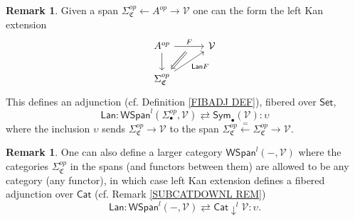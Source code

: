 \documentclass[a4paper,10pt
]{article}%
\numberwithin{equation}{section}
\numberwithin{figure}{section}
\theoremstyle{definition} %
\newtheorem{remark}[equation]{Remark}%
\newcommand{\1}{\ensuremath{\mathbbm 1}}%
\begin{document}
\begin{remark}\label{LANADJ REM}
	Given a span $\Sigma^{op}_{\mathfrak{C}} \leftarrow A^{op} \rightarrow \mathcal{V}$
	one can the form the left Kan extension
	\[
	\begin{tikzcd}[column sep = 30pt]
	A^{op}
	\ar{r}[name=U,swap]{}{F} \ar{d} 
	&
	\mathcal{V}	
	\\
	|[alias=V]|
	\Sigma_{\mathfrak{C}}^{op} 
	\ar{ru}[swap]{\mathsf{Lan} F}
	\arrow[Leftarrow, from=V, to=U,shorten >=0.05cm,shorten <=0.05cm]
	\end{tikzcd}
	\]
	This defines an adjunction (cf. Definition \ref{FIBADJ DEF}),
	fibered over $\mathsf{Set}$,
	\[
	\mathsf{Lan} \colon
	\mathsf{WSpan}^l(\Sigma_{\bullet}^{op},\mathcal{V}) 
	\rightleftarrows
	\mathsf{Sym}_{\bullet}(\mathcal{V})
	\colon \upsilon
	\]
	where the inclusion $\upsilon$ sends $\Sigma^{op}_{\mathfrak{C}} \to \mathcal{V}$ 
	to the span
	$\Sigma^{op}_{\mathfrak{C}} \xleftarrow{=} \Sigma^{op}_{\mathfrak{C}} \to \mathcal{V}$.
\end{remark}



\begin{remark}
	One can also define a larger category 
	$\mathsf{WSpan}^l( - ,\mathcal{V})$
	where the categories $\Sigma_{\mathfrak{C}}^{op}$ in the spans (and functors between them) are allowed to be any category (any functor),
	in which case left Kan extension defines a fibered adjunction over 
	$\mathsf{Cat}$ (cf. Remark \ref{SUBCATDOWNL REM})
	\[
	\mathsf{Lan} \colon
	\mathsf{WSpan}^l( - ,\mathcal{V}) 
	\rightleftarrows
	\mathsf{Cat} \downarrow ^l \mathcal{V}
	\colon \upsilon.
	\]
\end{remark}
\end{document}
